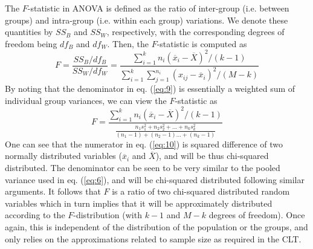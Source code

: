 \documentclass[10pt,final,Twcolumn]{IEEEtran}
\begin{document}
The $F$-statistic in ANOVA is defined as the ratio of inter-group (i.e. between groups) and intra-group (i.e. within each group) variations. We denote these quantities by $SS_B$ and $SS_W$, respectively, with the corresponding degrees of freedom being $df_B$ and $df_W$. Then, the $F$-statistic is computed as
\begin{equation}  \label{eq:9}
	F = \frac{SS_B/df_B}{SS_W/df_W} = \frac{\displaystyle\sum_{i=1}^{k} n_i\left(\overline {x}_i-\overline {X}\right)^2/\left(k-1\right)}{\displaystyle\sum_{i=1}^{k}\displaystyle\sum_{j=1}^{n_i} \left(x_{ij}-\overline {x}_i\right)^2/(M-k)}  
%
%
\end{equation}
By noting that the denominator in eq. (\ref{eq:9}) is essentially a weighted sum of individual group variances, we can view the $F$-statistic as  
\begin{equation} \label{eq:10}
	F =  \frac{\displaystyle\sum_{i=1}^{k} n_i\left(\overline {x}_i-\overline {X}\right)^2/\left(k-1\right)}{\frac{n_1s_1^2+n_2s_2^2+...+n_ks_k^2}{(n_1-1)+(n_2-1)...+(n_k-1)}}  
%
%
\end{equation}
One can see that the numerator in eq. (\ref{eq:10}) is squared difference of two normally distributed variables ($\overline {x}_i$ and $\overline {X}$), and will be thus chi-squared distributed. The denominator can be seen to be very similar to the pooled variance used in eq. (\ref{eq:6}), and will be chi-squared distributed following similar arguments. It follows that $F$ is a ratio of two chi-squared distributed random variables which in turn implies that it will be approximately distributed according to the $F$-distribution (with $k-1$ and $M-k$ degrees of freedom). Once again, this is independent of the distribution of the population or the groups, and only relies on the approximations related to sample size as required in the CLT. 
\end{document}
